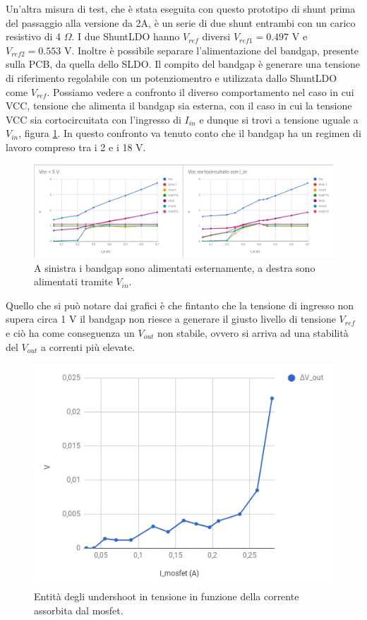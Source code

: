 Un'altra misura di test, che è stata eseguita con questo prototipo di shunt prima del passaggio alla versione da 2A, è un serie di due shunt entrambi con un carico resistivo di 4 $\Omega$. I due ShuntLDO hanno $V_{ref}$ diversi $V_{ref1}=0.497$ V e $V_{ref2}=0.553$ V. Inoltre è possibile separare l'alimentazione del bandgap, presente sulla PCB, da quella dello SLDO. Il compito del bandgap è generare una tensione di riferimento regolabile con un potenziomentro e utilizzata dallo ShuntLDO come $V_{ref}$.
Possiamo vedere a confronto il diverso comportamento nel caso in cui VCC, tensione che alimenta il bandgap sia esterna, con il caso in cui la tensione VCC sia cortocircuitata con l'ingresso di $I_{in}$ e dunque si trovi a tensione uguale a $V_{in}$, figura \ref{SLDO5Serie}. In questo confronto va tenuto conto che il bandgap ha un regimen di lavoro compreso tra  i 2 e i 18 V. 
\begin{figure}
\centering
\includegraphics[scale=.3]{Immagini/SLDO5Serie}
\caption{A sinistra i bandgap sono alimentati esternamente, a destra sono alimentati tramite $V_{in}$.}
\label{SLDO5Serie}
\end{figure}
Quello che si può notare dai grafici è che fintanto che la tensione di ingresso non supera circa 1 V il bandgap non riesce a generare il giusto livello di tensione $V_{ref}$ e ciò ha come conseguenza un $V_{out}$ non stabile, ovvero si arriva ad una stabilità del $V_{out}$ a correnti più elevate.

\begin{figure}
\centering
\includegraphics[scale=.4]{Immagini/SLDO5singlepulse}
\caption{Entità degli undershoot in tensione in funzione della corrente assorbita dal mosfet.}
\label{SLDO5singlepulse}
\end{figure}

